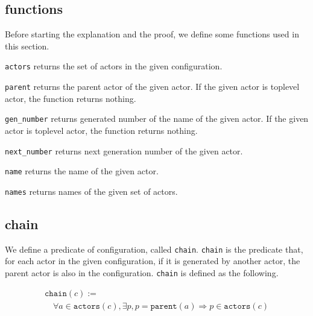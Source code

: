 \subsection{functions}

Before starting the explanation and the proof, we define some functions used in this section.

\begin{description}[style=nextline,leftmargin=12pt,parsep=0pt]
\item[\texttt{actors} $: \textit{Configuration} \rightarrow \textit{Set(Actor)}$]
  \texttt{actors} returns the set of actors in the given configuration.
\item[\texttt{parent} $: \textit{Actor} \rightarrow \textit{Actor}$]
  \texttt{parent} returns the parent actor of the given actor.
  If the given actor is toplevel actor, the function returns nothing. %
\item[\texttt{gen\_number} $: \textit{Actor} \rightarrow \mathbb{N}$]
  \texttt{gen\_number} returns generated number of the name of the given actor.
  If the given actor is toplevel actor, the function returns nothing.
\item[\texttt{next\_number} $: \textit{Actor} \rightarrow \mathbb{N}$]
  \texttt{next\_number} returns next generation number of the given actor.
\item[\texttt{name} $: \textit{Actor} \rightarrow \textit{Name}$]
  \texttt{name} returns the name of the given actor.
\item[\texttt{names} $: \textit{Set(Actor)} \rightarrow \textit{Set(Name)}$]
  \texttt{names} returns names of the given set of actors.
\end{description}

\subsection{chain}
We define a predicate of configuration, called \texttt{chain}.
\texttt{chain} is the predicate that, for each actor in the given configuration, if it is generated by another actor, the parent actor is also in the configuration.
\texttt{chain} is defined as the following.

\begin{displaymath}
  \begin{array}{l}
    \texttt{chain}(c) := \\
    \quad \forall a \in \texttt{actors}(c), \exists p, p = \texttt{parent}(a) \Rightarrow p \in \texttt{actors}(c)
  \end{array}
\end{displaymath}

